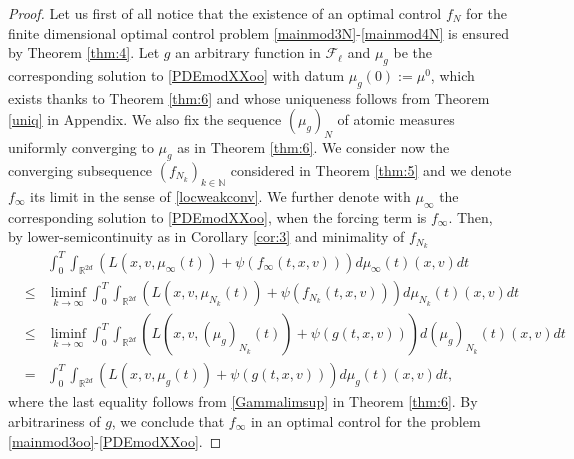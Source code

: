 \documentclass[11pt]{article}
\theoremstyle{plain}
\theoremstyle{definition}
\theoremstyle{remark}
\numberwithin{equation}{section}
\begin{document}
\begin{proof}
Let us first of all notice that the existence of an optimal control $f_N$ for the finite dimensional optimal control problem \eqref{mainmod3N}-\eqref{mainmod4N} is ensured by Theorem \ref{thm:4}.
Let $g$ an arbitrary function in $\mathcal F_\ell$ and $\mu_g$ be the corresponding solution to \eqref{PDEmodXXoo} with datum $\mu_g(0):=\mu^0$, which exists thanks to Theorem \ref{thm:6} and whose uniqueness follows from Theorem \ref{uniq} in Appendix.
We also fix the  sequence $(\mu_g)_{N}$ of atomic measures uniformly converging to $\mu_g$ as in Theorem \ref{thm:6}.
We consider now the converging subsequence $(f_{N_k})_{k \in \mathbb N}$ considered in Theorem \ref{thm:5} and we denote $f_\infty$ its limit in the sense of \eqref{locweakconv}. We further denote
with $\mu_{\infty}$ the corresponding solution to \eqref{PDEmodXXoo}, when the forcing term is $f_\infty$. Then, by lower-semicontinuity as in Corollary \ref{cor:3} and minimality of $f_{N_k}$ 
\begin{eqnarray*}
&&\int_0^T \int_{\mathbb R^{2d}} (L(x,v,\mu_{\infty}(t)) + \psi(f_\infty(t,x,v))) d\mu_{\infty}(t)(x,v) dt \\
&\leq& \liminf_{k \to \infty} \int_0^T \int_{\mathbb R^{2d}} (L(x,v,\mu_{N_k}(t)) + \psi(f_{N_k}(t,x,v))) d\mu_{N_k}(t)(x,v) dt\\
&\leq& \liminf_{k \to \infty} \int_0^T \int_{\mathbb R^{2d}} (L(x,v,(\mu_g)_{N_k}(t)) + \psi(g(t,x,v))) d(\mu_g)_{N_k}(t)(x,v) dt\\
&=& \int_0^T \int_{\mathbb R^{2d}} (L(x,v,\mu_g(t)) + \psi(g(t,x,v))) d\mu_g(t)(x,v) dt,
\end{eqnarray*}
where the last equality follows from \eqref{Gammalimsup} in Theorem \ref{thm:6}. By arbitrariness of $g$, we conclude that $f_\infty$ in an optimal control for the problem \eqref{mainmod3oo}-\eqref{PDEmodXXoo}.
\end{proof}
\end{document}
